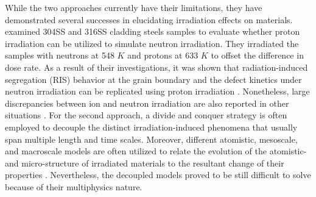 \documentclass[utf8]{frontiersSCNS} %
\begin{document}
While the two approaches currently have their limitations, they have demonstrated several successes in elucidating irradiation effects on materials. \citep{was_emulation_2002} examined 304SS and 316SS cladding steels samples to evaluate whether proton irradiation can be utilized to simulate neutron irradiation. They irradiated the samples with neutrons at 548 $K$ and protons at 633 $K$ to offset the difference in dose rate. As a result of their investigations, it was shown that radiation-induced segregation (RIS) behavior at the grain boundary and the defect kinetics under neutron irradiation can be replicated using proton irradiation \citep{was_emulation_2002}. Nonetheless, large discrepancies between ion and neutron irradiation are also reported in other situations \citep{was2017}.  For the second approach, a divide and conquer strategy is often employed to decouple the distinct irradiation-induced phenomena that usually span multiple length and time scales. Moreover, different atomistic, mesoscale, and macroscale models are often utilized to relate the evolution of the atomistic- and micro-structure of irradiated materials to the resultant change of their properties \citep{was2017}. Nevertheless, the decoupled models proved to be still difficult to solve because of their multiphysics nature. 
\end{document}
